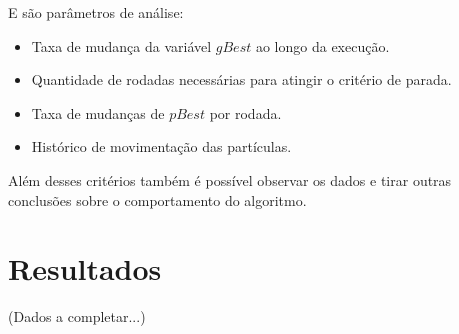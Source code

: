 \noindent E são parâmetros de análise:\hfill
\begin{itemize}
\item Taxa de mudança da variável $gBest$ ao longo da execução.
\item Quantidade de rodadas necessárias para atingir o critério de parada.
\item Taxa de mudanças de $pBest$ por rodada.
\item Histórico de movimentação das partículas.
\end{itemize}

Além desses critérios também é possível observar os dados e tirar outras conclusões sobre o comportamento do algoritmo.\hfill

%


\section{Resultados}
(Dados a completar...)
%
